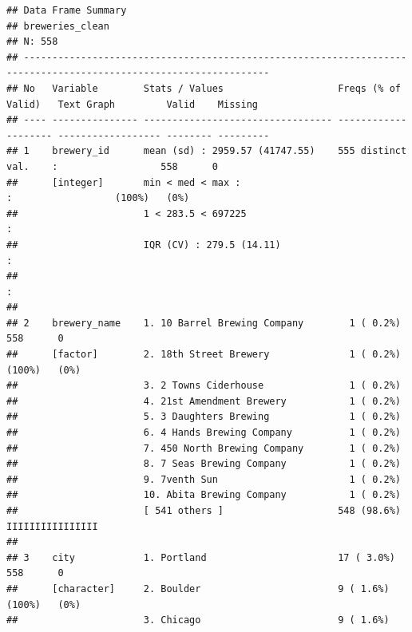 \documentclass[]{article}
\begin{document}
\begin{verbatim}
## Data Frame Summary   
## breweries_clean     
## N: 558   
## -----------------------------------------------------------------------------------------------------------------
## No   Variable        Stats / Values                    Freqs (% of Valid)   Text Graph         Valid    Missing  
## ---- --------------- --------------------------------- -------------------- ------------------ -------- ---------
## 1    brewery_id      mean (sd) : 2959.57 (41747.55)    555 distinct val.    :                  558      0        
##      [integer]       min < med < max :                                      :                  (100%)   (0%)     
##                      1 < 283.5 < 697225                                     :                                    
##                      IQR (CV) : 279.5 (14.11)                               :                                    
##                                                                             :                                    
## 
## 2    brewery_name    1. 10 Barrel Brewing Company        1 ( 0.2%)                             558      0        
##      [factor]        2. 18th Street Brewery              1 ( 0.2%)                             (100%)   (0%)     
##                      3. 2 Towns Ciderhouse               1 ( 0.2%)                                               
##                      4. 21st Amendment Brewery           1 ( 0.2%)                                               
##                      5. 3 Daughters Brewing              1 ( 0.2%)                                               
##                      6. 4 Hands Brewing Company          1 ( 0.2%)                                               
##                      7. 450 North Brewing Company        1 ( 0.2%)                                               
##                      8. 7 Seas Brewing Company           1 ( 0.2%)                                               
##                      9. 7venth Sun                       1 ( 0.2%)                                               
##                      10. Abita Brewing Company           1 ( 0.2%)                                               
##                      [ 541 others ]                    548 (98.6%)          IIIIIIIIIIIIIIII                     
## 
## 3    city            1. Portland                       17 ( 3.0%)                              558      0        
##      [character]     2. Boulder                        9 ( 1.6%)                               (100%)   (0%)     
##                      3. Chicago                        9 ( 1.6%)                                                 

\end{verbatim}
\end{document}
